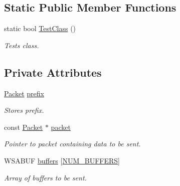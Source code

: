 \subsection*{Static Public Member Functions}
\begin{DoxyCompactItemize}
\item 
static bool \hyperlink{class_net_send_prefix_affd38aa5e686b11b8dc172500068cbd0}{TestClass} ()
\begin{DoxyCompactList}\small\item\em Tests class. \item\end{DoxyCompactList}\end{DoxyCompactItemize}
\subsection*{Private Attributes}
\begin{DoxyCompactItemize}
\item 
\hypertarget{class_net_send_prefix_a56b813ee0be98a6a23bdcc00863b8bba}{
\hyperlink{class_packet}{Packet} \hyperlink{class_net_send_prefix_a56b813ee0be98a6a23bdcc00863b8bba}{prefix}}
\label{class_net_send_prefix_a56b813ee0be98a6a23bdcc00863b8bba}

\begin{DoxyCompactList}\small\item\em Stores prefix. \item\end{DoxyCompactList}\item 
\hypertarget{class_net_send_prefix_a90e39e80bb44c4bdd111ca489a66094e}{
const \hyperlink{class_packet}{Packet} $\ast$ \hyperlink{class_net_send_prefix_a90e39e80bb44c4bdd111ca489a66094e}{packet}}
\label{class_net_send_prefix_a90e39e80bb44c4bdd111ca489a66094e}

\begin{DoxyCompactList}\small\item\em Pointer to packet containing data to be sent. \item\end{DoxyCompactList}\item 
WSABUF \hyperlink{class_net_send_prefix_a5826e25aab8cc3719dca77eb991d7861}{buffers} \mbox{[}\hyperlink{class_net_send_prefix_a6cba1d99ccc9592bfecf1c0194a4cd8c}{NUM\_\-BUFFERS}\mbox{]}
\begin{DoxyCompactList}\small\item\em Array of buffers to be sent. \item\end{DoxyCompactList}\end{DoxyCompactItemize}
